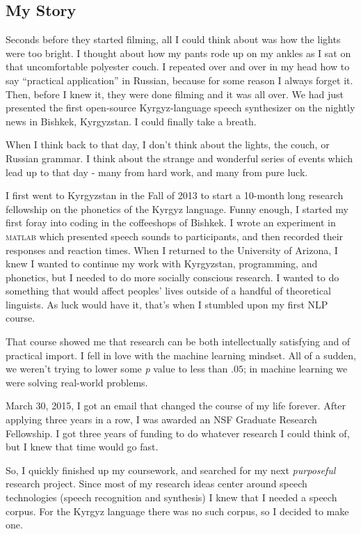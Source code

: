 \documentclass[12pt,a4paper]{article}
\begin{document}
\subsection*{My Story}

Seconds before they started filming, all I could think about was how the lights were too bright. I thought about how my pants rode up on my ankles as I sat on that uncomfortable polyester couch. I repeated over and over in my head how to say ``practical application'' in Russian, because for some reason I always forget it. Then, before I knew it, they were done filming and it was all over. We had just presented the first open-source Kyrgyz-language speech synthesizer on the nightly news in Bishkek, Kyrgyzstan. I could finally take a breath.

When I think back to that day, I don't think about the lights, the couch, or Russian grammar. I think about the strange and wonderful series of events which lead up to that day - many from hard work, and many from pure luck.


I first went to Kyrgyzstan in the Fall of 2013 to start a 10-month long research fellowship on the phonetics of the Kyrgyz language. Funny enough, I started my first foray into coding in the coffeeshops of Bishkek. I wrote an experiment in \textsc{matlab} which presented speech sounds to participants, and then recorded their responses and reaction times. When I returned to the University of Arizona, I knew I wanted to continue my work with Kyrgyzstan, programming, and phonetics, but I needed to do more socially conscious research. I wanted to do something that would affect peoples' lives outside of a handful of theoretical linguists. As luck would have it, that's when I stumbled upon my first NLP course.

That course showed me that research can be both intellectually satisfying and of practical import. I fell in love with the machine learning mindset. All of a sudden, we weren't trying to lower some \textit{p} value to less than $.05$; in machine learning we were solving real-world problems.

March 30, 2015, I got an email that changed the course of my life forever. After applying three years in a row, I was awarded an NSF Graduate Research Fellowship. I got three years of funding to do whatever research I could think of, but I knew that time would go fast.

So, I quickly finished up my coursework, and searched for my next \textit{purposeful} research project. Since most of my research ideas center around speech technologies (speech recognition and synthesis) I knew that I needed a speech corpus. For the Kyrgyz language there was no such corpus, so I decided to make one.
\end{document}
